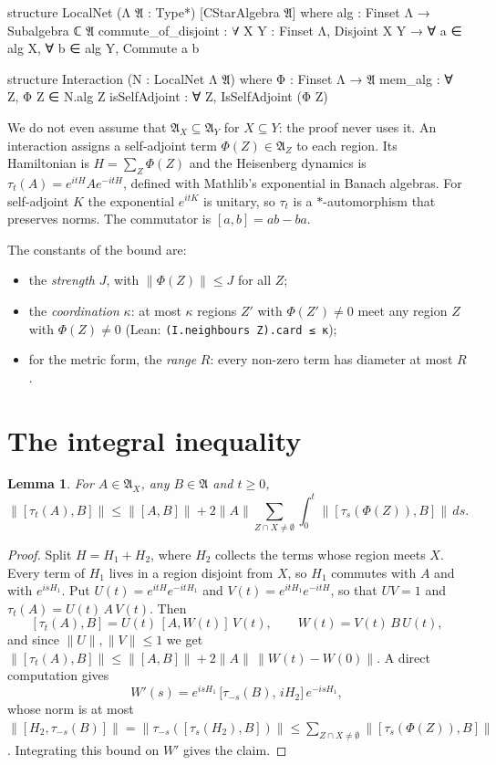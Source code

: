 \documentclass[11pt]{article}
\newtheorem{lemma}[theorem]{Lemma}
\theoremstyle{definition}
\theoremstyle{remark}
\newcommand{\fA}{\mathfrak{A}}
\newcommand{\norm}[1]{\|#1\|}
\begin{document}
\begin{lean}
structure LocalNet (Λ 𝔄 : Type*) [CStarAlgebra 𝔄] where
  alg : Finset Λ → Subalgebra ℂ 𝔄
  commute_of_disjoint : ∀ {X Y : Finset Λ}, Disjoint X Y →
    ∀ a ∈ alg X, ∀ b ∈ alg Y, Commute a b

structure Interaction (N : LocalNet Λ 𝔄) where
  Φ : Finset Λ → 𝔄
  mem_alg : ∀ Z, Φ Z ∈ N.alg Z
  isSelfAdjoint : ∀ Z, IsSelfAdjoint (Φ Z)
\end{lean}

We do not even assume that $\fA_X\subseteq\fA_Y$ for $X\subseteq Y$: the proof never uses it. An
interaction assigns a self-adjoint term $\Phi(Z)\in\fA_Z$ to each region. Its Hamiltonian is
$H=\sum_Z\Phi(Z)$ and the Heisenberg dynamics is $\tau_t(A)=e^{itH}Ae^{-itH}$, defined with
Mathlib's exponential in Banach algebras. For self-adjoint $K$ the exponential $e^{itK}$ is
unitary, so $\tau_t$ is a $*$-automorphism that preserves norms. The commutator is
$[a,b]=ab-ba$.

The constants of the bound are:
\begin{itemize}
  \item the \emph{strength} $J$, with $\norm{\Phi(Z)}\le J$ for all $Z$;
  \item the \emph{coordination} $\kappa$: at most $\kappa$ regions $Z'$ with $\Phi(Z')\neq0$ meet
  any region $Z$ with $\Phi(Z)\ne0$ (Lean: \texttt{(I.neighbours Z).card ≤ κ});
  \item for the metric form, the \emph{range} $R$: every non-zero term has diameter at most $R$.
\end{itemize}

\section{The integral inequality}\label{sec:onestep}

\begin{lemma}\label{lem:onestep}
For $A\in\fA_X$, any $B\in\fA$ and $t\ge0$,
\[
  \norm{[\tau_t(A),B]}\le\norm{[A,B]}
  +2\norm{A}\sum_{Z\cap X\ne\emptyset}\int_0^t\norm{[\tau_s(\Phi(Z)),B]}\,ds .
\]
\end{lemma}

\begin{proof}
Split $H=H_1+H_2$, where $H_2$ collects the terms whose region meets $X$. Every term of $H_1$ lives
in a region disjoint from $X$, so $H_1$ commutes with $A$ and with $e^{isH_1}$. Put
$U(t)=e^{itH}e^{-itH_1}$ and $V(t)=e^{itH_1}e^{-itH}$, so that $UV=1$ and
$\tau_t(A)=U(t)\,A\,V(t)$. Then
\[
  [\tau_t(A),B]=U(t)\,[A,W(t)]\,V(t),\qquad W(t)=V(t)\,B\,U(t),
\]
and since $\norm{U},\norm{V}\le1$ we get
$\norm{[\tau_t(A),B]}\le\norm{[A,B]}+2\norm A\,\norm{W(t)-W(0)}$. A direct computation gives
\[
  W'(s)=e^{isH_1}\,\big[\tau_{-s}(B),\,iH_2\big]\,e^{-isH_1},
\]
whose norm is at most $\norm{[H_2,\tau_{-s}(B)]}=\norm{\tau_{-s}([\tau_s(H_2),B])}\le
\sum_{Z\cap X\neq\emptyset}\norm{[\tau_s(\Phi(Z)),B]}$. Integrating this bound on $W'$ gives
the claim.
\end{proof}
\end{document}
